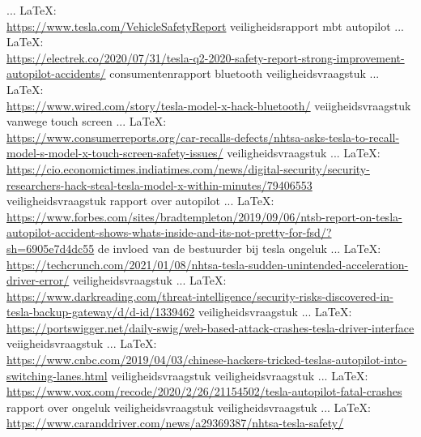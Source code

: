 \begin{thebibliography}{99}
{{{{ ... \LaTeX:\\ \url{https://www.tesla.com/VehicleSafetyReport}
veiligheidsrapport mbt autopilot
 ... \LaTeX:\\ \url{https://electrek.co/2020/07/31/tesla-q2-2020-safety-report-strong-improvement-autopilot-accidents/}
consumentenrapport
bluetooth veiligheidsvraagstuk
 ... \LaTeX:\\ \url{https://www.wired.com/story/tesla-model-x-hack-bluetooth/}
veiigheidsvraagstuk vanwege touch screen
 ... \LaTeX:\\ \url{https://www.consumerreports.org/car-recalls-defects/nhtsa-asks-tesla-to-recall-model-s-model-x-touch-screen-safety-issues/}
veiligheidsvraagstuk
 ... \LaTeX:\\ \url{https://cio.economictimes.indiatimes.com/news/digital-security/security-researchers-hack-steal-tesla-model-x-within-minutes/79406553}
veiligheidsvraagstuk
rapport over autopilot
 ... \LaTeX:\\ \url{https://www.forbes.com/sites/bradtempleton/2019/09/06/ntsb-report-on-tesla-autopilot-accident-shows-whats-inside-and-its-not-pretty-for-fsd/?sh=6905e7d4dc55}
de invloed van de bestuurder bij tesla ongeluk
 ... \LaTeX:\\ \url{https://techcrunch.com/2021/01/08/nhtsa-tesla-sudden-unintended-acceleration-driver-error/}
veiligheidsvraagstuk
 ... \LaTeX:\\ \url{https://www.darkreading.com/threat-intelligence/security-risks-discovered-in-tesla-backup-gateway/d/d-id/1339462}
veiligheidsvraagstuk
 ... \LaTeX:\\ \url{https://portswigger.net/daily-swig/web-based-attack-crashes-tesla-driver-interface}
veiigheidsvraagstuk
 ... \LaTeX:\\ \url{https://www.cnbc.com/2019/04/03/chinese-hackers-tricked-teslas-autopilot-into-switching-lanes.html}
veiligheidsvraagstuk
veiligheidsvraagstuk
 ... \LaTeX:\\ \url{https://www.vox.com/recode/2020/2/26/21154502/tesla-autopilot-fatal-crashes}
rapport over ongeluk
veiligheidsvraagstuk
veiligheidsvraagstuk
 ... \LaTeX:\\ \url{https://www.caranddriver.com/news/a29369387/nhtsa-tesla-safety/}
}}}}
\end{thebibliography}
